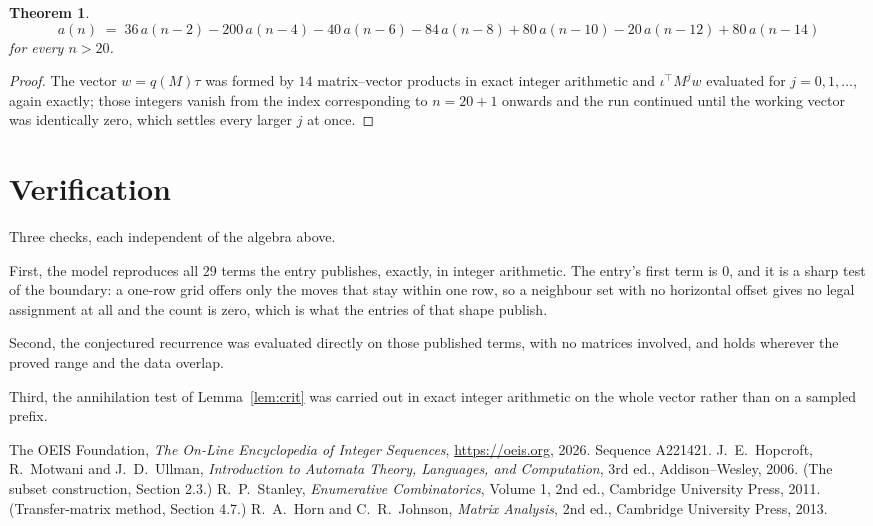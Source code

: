 \documentclass[11pt,a4paper]{article}
\theoremstyle{plain}
\newtheorem{theorem}{Theorem}
\theoremstyle{definition}
\begin{document}
\begin{theorem}
\[
a(n)\;=\;36\,a(n-2) - 200\,a(n-4) - 40\,a(n-6) - 84\,a(n-8) + 80\,a(n-10) - 20\,a(n-12) + 80\,a(n-14)
\]
for every $n>20$.
\end{theorem}

\begin{proof}
The vector $w=q(M)\tau$ was formed by $14$ matrix--vector products in exact integer
arithmetic and $\iota^{\!\top}M^{j}w$ evaluated for $j=0,1,\dots$, again exactly; those
integers vanish from the index corresponding to $n=20+1$ onwards and the run continued
until the working vector was identically zero, which settles every larger $j$ at once.
\end{proof}

\section{Verification}

Three checks, each independent of the algebra above.

First, the model reproduces all $29$ terms the entry publishes, exactly, in integer
arithmetic. The entry's first term is $0$, and it is a sharp test of the boundary: a
one-row grid offers only the moves that stay within one row, so a neighbour set with no
horizontal offset gives no legal assignment at all and the count is zero, which is what the
entries of that shape publish.

Second, the conjectured recurrence was evaluated directly on those published terms, with no
matrices involved, and holds wherever the proved range and the data overlap.

Third, the annihilation test of Lemma~\ref{lem:crit} was carried out in exact integer
arithmetic on the whole vector rather than on a sampled prefix.

\begin{thebibliography}{9}
 The OEIS Foundation, \emph{The On-Line Encyclopedia of Integer
Sequences}, \url{https://oeis.org}, 2026. Sequence A221421.
 J.~E.~Hopcroft, R.~Motwani and J.~D.~Ullman, \emph{Introduction to Automata
Theory, Languages, and Computation}, 3rd ed., Addison--Wesley, 2006. (The subset
construction, Section 2.3.)
 R.~P.~Stanley, \emph{Enumerative Combinatorics}, Volume 1, 2nd ed.,
Cambridge University Press, 2011. (Transfer-matrix method, Section 4.7.)
 R.~A.~Horn and C.~R.~Johnson, \emph{Matrix Analysis}, 2nd ed., Cambridge
University Press, 2013.
\end{thebibliography}
\end{document}
